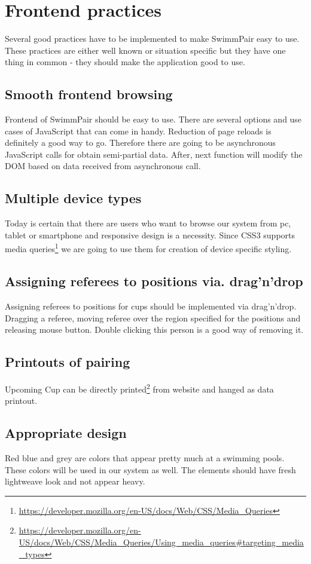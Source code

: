 \section{Frontend practices}
Several good practices have to be implemented to make SwimmPair easy to use. These practices are either well known or situation specific but they have one thing in common - they should make the application good to use.
\subsection*{Smooth frontend browsing}
\par
Frontend of SwimmPair should be easy to use. There are several options and use cases of JavaScript that can come in handy. Reduction of page reloads is definitely a good way to go. Therefore there are going to be asynchronous JavaScript calls for obtain semi-partial data. After, next function will modify the DOM based on data received from asynchronous call. 
\subsection*{Multiple device types}
\par
Today is certain that there are users who want to browse our system from pc, tablet or smartphone and responsive design is a necessity. Since CSS3 supports media queries\footnote{\url{https://developer.mozilla.org/en-US/docs/Web/CSS/Media_Queries}} we are going to use them for creation of device specific styling.
\subsection*{Assigning referees to positions via. drag'n'drop}
\par
Assigning referees to positions for cups should be implemented via drag'n'drop. Dragging a referee, moving referee over the region specified for the positions and releasing mouse button. Double clicking this person is a good way of removing it.
\subsection*{Printouts of pairing}
Upcoming Cup can be directly printed\footnote{\url{https://developer.mozilla.org/en-US/docs/Web/CSS/Media_Queries/Using_media_queries\#targeting_media_types}} from website and hanged as data printout. 
\subsection*{Appropriate design}
\par
Red blue and grey are colors that appear pretty much at a swimming pools. These colors will be used in our system as well. The elements should have fresh lightweave look and not appear heavy.
